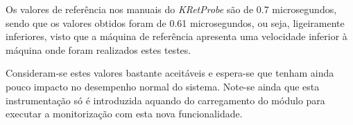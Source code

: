 Os valores de referência nos manuais do \textit{KRetProbe} são de 0.7 microsegundos\cite{KProbeKernel}, sendo que os valores obtidos foram de 0.61 microsegundos, ou seja, ligeiramente inferiores, visto que a máquina de referência apresenta uma velocidade inferior à máquina onde foram realizados estes testes.

Consideram-se estes valores bastante aceitáveis e espera-se que tenham ainda pouco impacto no desempenho normal do sistema.
Note-se ainda que esta instrumentação só é introduzida aquando do carregamento do módulo para executar a monitorização com esta nova funcionalidade.



